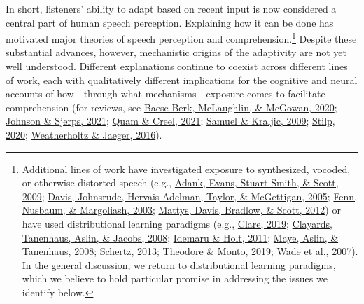 \documentclass[
  11pt,
  man,floatsintext]{apa6}
\begin{document}
In short, listeners' ability to adapt based on recent input is now considered a central part of human speech perception. Explaining how it can be done has motivated major theories of speech perception and comprehension.\footnote{Additional lines of work have investigated exposure to synthesized, vocoded, or otherwise distorted speech (e.g., \protect\hyperlink{ref-adank2009}{Adank, Evans, Stuart-Smith, \& Scott, 2009}; \protect\hyperlink{ref-davis2005}{Davis, Johnsrude, Hervais-Adelman, Taylor, \& McGettigan, 2005}; \protect\hyperlink{ref-fenn2003}{Fenn, Nusbaum, \& Margoliash, 2003}; \protect\hyperlink{ref-mattys2012}{Mattys, Davis, Bradlow, \& Scott, 2012}) or have used distributional learning paradigms (e.g., \protect\hyperlink{ref-clare2019}{Clare, 2019}; \protect\hyperlink{ref-clayards2008}{Clayards, Tanenhaus, Aslin, \& Jacobs, 2008}; \protect\hyperlink{ref-idemaru-holt2011}{Idemaru \& Holt, 2011}; \protect\hyperlink{ref-maye2008}{Maye, Aslin, \& Tanenhaus, 2008}; \protect\hyperlink{ref-schertz2013}{Schertz, 2013}; \protect\hyperlink{ref-theodore-monto2019}{Theodore \& Monto, 2019}; \protect\hyperlink{ref-wade2007}{Wade et al., 2007}). In the general discussion, we return to distributional learning paradigms, which we believe to hold particular promise in addressing the issues we identify below.} Despite these substantial advances, however, mechanistic origins of the adaptivity are not yet well understood. Different explanations continue to coexist across different lines of work, each with qualitatively different implications for the cognitive and neural accounts of how---through what mechanisms---exposure comes to facilitate comprehension (for reviews, see \protect\hyperlink{ref-baeseberk2020}{Baese-Berk, McLaughlin, \& McGowan, 2020}; \protect\hyperlink{ref-johnson-sjerps2021}{Johnson \& Sjerps, 2021}; \protect\hyperlink{ref-quam-creel2021}{Quam \& Creel, 2021}; \protect\hyperlink{ref-samuel-kraljic2009}{Samuel \& Kraljic, 2009}; \protect\hyperlink{ref-stilp2020}{Stilp, 2020}; \protect\hyperlink{ref-weatherholtz-jaeger2016}{Weatherholtz \& Jaeger, 2016}).
\end{document}
